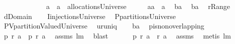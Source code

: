 \begin{isabellebody}
\ \ \ \ \ \ \ \ \ \ \ \ \ {\isachardoublequoteopen}a{}\ {\isasymunion}\ a{}\ {\isasymin}\ allocationsUniverse{\isachardoublequoteclose}\isanewline
%
\isadelimproof
%
\endisadelimproof
%
\isatagproof
{}\isamarkupfalse%
\ {\isacharminus}\isanewline
\ \ \isamarkupfalse%
\ {\isacharquery}a{\isacharequal}{\isachardoublequoteopen}a{}\ {\isasymunion}\ a{}{\isachardoublequoteclose}\ \isamarkupfalse%
\ {\isacharquery}b{}{\isacharequal}{\isachardoublequoteopen}a{}{\isacharcircum}{\isacharminus}{}{\isachardoublequoteclose}\ \isamarkupfalse%
\ {\isacharquery}b{}{\isacharequal}{\isachardoublequoteopen}a{}{\isacharcircum}{\isacharminus}{}{\isachardoublequoteclose}\ \isamarkupfalse%
\ {\isacharquery}r{\isacharequal}Range\ \isamarkupfalse%
\ {\isacharquery}d{\isacharequal}Domain\isanewline
\ \ \isamarkupfalse%
\ {\isacharquery}I{\isacharequal}injectionsUniverse\ \isamarkupfalse%
\ {\isacharquery}P{\isacharequal}partitionsUniverse\ \isamarkupfalse%
\ {\isacharquery}PV{\isacharequal}partitionValuedUniverse\ \isamarkupfalse%
\ {\isacharquery}u{\isacharequal}runiq\isanewline
\ \ \isamarkupfalse%
\ {\isacharquery}b{\isacharequal}{\isachardoublequoteopen}{\isacharquery}a{\isacharcircum}{\isacharminus}{}{\isachardoublequoteclose}\ \isamarkupfalse%
\ {\isacharquery}p{\isacharequal}is{\isacharunderscore}non{\isacharunderscore}overlapping\isanewline
\ \ \isamarkupfalse%
\ {\isachardoublequoteopen}{\isacharquery}p\ {\isacharparenleft}{\isacharquery}r\ a{}{\isacharparenright}\ {\isacharampersand}\ {\isacharquery}p\ {\isacharparenleft}{\isacharquery}r\ a{}{\isacharparenright}{\isachardoublequoteclose}\ \isamarkupfalse%
\ assms\ lm{}{}\ \isamarkupfalse%
\ blast\ \isamarkupfalse%
\isanewline
\ \ \isamarkupfalse%
\ \isamarkupfalse%
\ {\isachardoublequoteopen}{\isacharquery}p\ {\isacharparenleft}{\isacharquery}r\ a{}\ {\isasymunion}\ {\isacharquery}r\ a{}{\isacharparenright}{\isachardoublequoteclose}\ \isamarkupfalse%
\ assms\ \isamarkupfalse%
\ {\isacharparenleft}metis\ lm{}{}{\isacharparenright}\isanewline
\ \ \isamarkupfalse%

\end{isabellebody}
